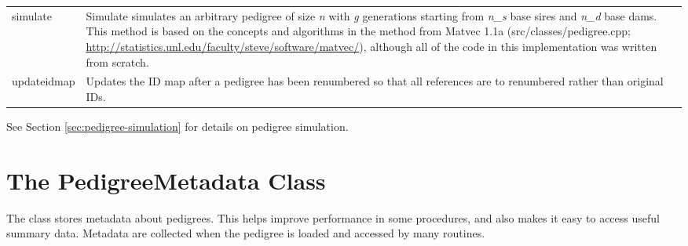 \begin{center}
\begin{xtabular}{l|p{4in}}
	simulate & Simulate simulates an arbitrary pedigree of size \textit{n} with \textsl{g} generations starting from \textsl{n\_s} base sires and \textsl{n\_d} base dams.  This method is based on the concepts and algorithms in the  method from Matvec 1.1a (src/classes/pedigree.cpp; \url{http://statistics.unl.edu/faculty/steve/software/matvec/}), although all of the code in this implementation was written from scratch.\\
	updateidmap & Updates the ID map after a pedigree has been renumbered so that all references are to renumbered rather than original IDs. \\
    \end{xtabular}
\end{center}
See Section \ref{sec:pedigree-simulation} for details on pedigree simulation.
\section{The PedigreeMetadata Class}
\label{sec:objects-metadata-objects}
The  class stores metadata about pedigrees. This helps improve performance in some procedures, and also makes it easy to access useful summary data. Metadata are collected when the pedigree is loaded and accessed by many \PyPedal{} routines.
